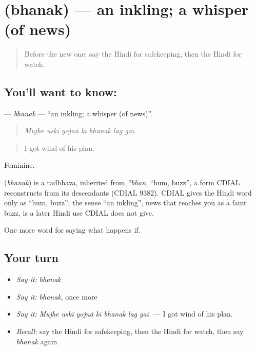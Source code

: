 \section[\texorpdfstring{\hi{भनक} (bhanak)}{भनक (bhanak)}]{ (bhanak) — an inkling; a whisper (of news)}

\label{lesson:HI-C547-bhanak}



\begin{quote}
Before the new one: say the Hindi for safekeeping, then the Hindi for watch.
\end{quote}

\subsection*{You'll want to know: }
\textbf{} — \emph{bhanak} — \textquotedblleft{}an inkling; a whisper (of news)\textquotedblright{}.

\begin{quote}
      
\end{quote}

\begin{quote}
\emph{Mujhe uskī yojnā kī bhanak lag gaī.}
\end{quote}

\begin{quote}
I got wind of his plan.
\end{quote}

Feminine.

\begin{cousinweb}
\textbf{} (\emph{bhanak}) is a tadbhava, inherited from \emph{*bhan}, \textquotedblleft{}hum, buzz\textquotedblright{}, a form CDIAL reconstructs from its descendants (CDIAL 9382). CDIAL gives the Hindi word only as \textquotedblleft{}hum, buzz\textquotedblright{}; the sense \textquotedblleft{}an inkling\textquotedblright{}, news that reaches you as a faint buzz, is a later Hindi use CDIAL does not give.
\end{cousinweb}

\begin{grammarlens}[title={What you've built}]
One more word for saying what happens if.
\end{grammarlens}

\subsection*{Your turn}
\begin{itemize}
\raggedright
  \item \emph{Say it:} \emph{bhanak}
  \item \emph{Say it:} \emph{bhanak}, once more
  \item \emph{Say it:} \emph{Mujhe uskī yojnā kī bhanak lag gaī.} — I got wind of his plan.
  \item \emph{Recall:} say the Hindi for safekeeping, then the Hindi for watch, then say \emph{bhanak} again
\end{itemize}

